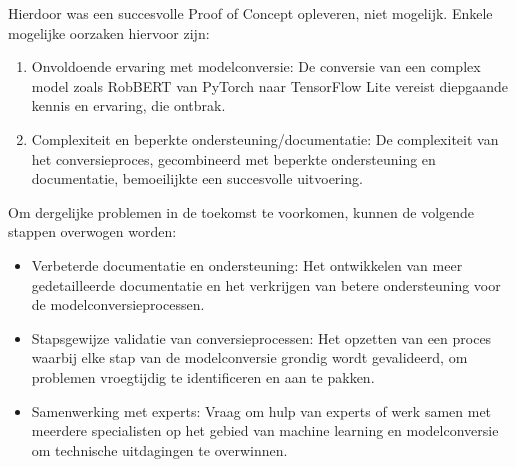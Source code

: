 Hierdoor was een succesvolle Proof of Concept opleveren, niet mogelijk. Enkele mogelijke oorzaken hiervoor zijn:

\begin{enumerate}
    \item Onvoldoende ervaring met modelconversie: De conversie van een complex model zoals RobBERT van PyTorch naar TensorFlow Lite vereist diepgaande kennis en ervaring, die ontbrak.
    \item Complexiteit en beperkte ondersteuning/documentatie: De complexiteit van het conversieproces, gecombineerd met beperkte ondersteuning en documentatie, bemoeilijkte een succesvolle uitvoering.
\end{enumerate}

Om dergelijke problemen in de toekomst te voorkomen, kunnen de volgende stappen overwogen worden:

\begin{itemize}
    \item Verbeterde documentatie en ondersteuning: Het ontwikkelen van meer gedetailleerde documentatie en het verkrijgen van betere ondersteuning voor de modelconversieprocessen.
    \item Stapsgewijze validatie van conversieprocessen: Het opzetten van een proces waarbij elke stap van de modelconversie grondig wordt gevalideerd, om problemen vroegtijdig te identificeren en aan te pakken.
    \item Samenwerking met experts: Vraag om hulp van experts of werk samen met meerdere specialisten op het gebied van machine learning en modelconversie om technische uitdagingen te overwinnen.
\end{itemize}

